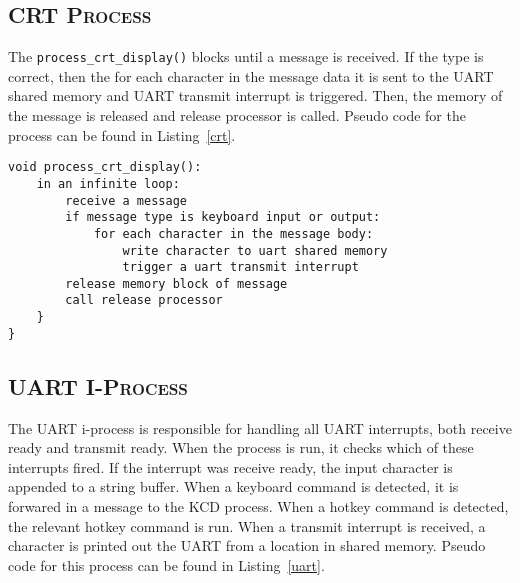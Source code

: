 \documentclass[oneside]{report}
\begin{document}
\subsection{\textsc{CRT Process}}
The \texttt{process\_crt\_display()} blocks until a message is
received. If the type is correct, then the for each character in the message 
data it is sent to the UART shared memory and UART transmit interrupt is 
triggered. Then, the memory of the message is released and release processor is 
called. Pseudo code for the process can be found in Listing~\ref{crt}.

\begin{lstlisting}
void process_crt_display():
    in an infinite loop:
        receive a message
        if message type is keyboard input or output:
            for each character in the message body:
                write character to uart shared memory
                trigger a uart transmit interrupt
        release memory block of message
        call release processor
    }
}
\end{lstlisting}

\subsection{\textsc{UART I-Process}}

The UART i-process is responsible for handling all UART interrupts,
both receive ready and transmit ready. When the process is run, it
checks which of these interrupts fired. If the interrupt was receive
ready, the input character is appended to a string buffer. When a
keyboard command is detected, it is forwared in a message to the KCD
process. When a hotkey command is detected, the relevant hotkey
command is run. When a transmit interrupt is received, a character is
printed out the UART from a location in shared memory. Pseudo code for
this process can be found in Listing~\ref{uart}.
\end{document}
